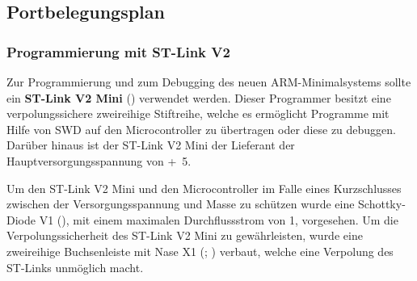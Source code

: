 \subsection{Portbelegungsplan}
\label{sec:coremodul-portbelegung}

\subsubsection{Programmierung mit ST-Link V2}
\label{sec:coremodul-stlink}
Zur Programmierung und zum \gls{Debugging} des neuen \gls{ARM}-\gls{Minimalsystem}s sollte ein \textbf{ST-Link V2 Mini} () verwendet werden. Dieser Programmer besitzt eine verpolungssichere zweireihige Stiftreihe, welche es ermöglicht Programme mit Hilfe von \gls{SWD} auf den Microcontroller zu übertragen oder diese zu debuggen. Darüber hinaus ist der ST-Link V2 Mini der Lieferant der Hauptversorgungsspannung von \unit{+5}{\volt}.

Um den ST-Link V2 Mini und den Microcontroller im Falle eines Kurzschlusses zwischen der Versorgungsspannung und Masse zu schützen wurde eine Schottky-Diode V1 (), mit einem maximalen Durchflussstrom von \unit{1}{\ampere}, vorgesehen. Um die Verpolungssicherheit des ST-Link V2 Mini zu gewährleisten, wurde eine zweireihige Buchsenleiste mit Nase X1 (; ) verbaut, welche eine Verpolung des ST-Links unmöglich macht.


